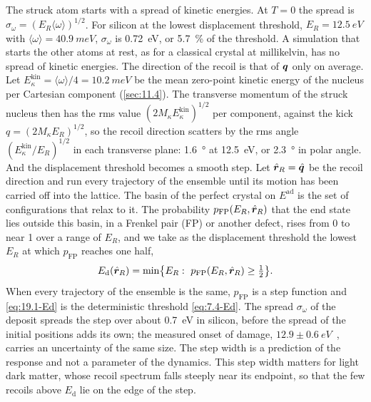 The struck atom starts with a spread of kinetic energies. At $T = 0$ the spread is $\sigma_\omega = (E_R\langle\omega\rangle)^{1/2}$. For silicon at the lowest displacement threshold, $E_R = \SI{12.5}{eV}$ with $\langle\omega\rangle = \SI{40.9}{meV}$, $\sigma_\omega$ is \SI{0.72}{eV}, or \SI{5.7}{\percent} of the threshold. A simulation that starts the other atoms at rest, as for a classical crystal at millikelvin, has no spread of kinetic energies. The direction of the recoil is that of $\bm{q}$ only on average. Let $E^{\mathrm{kin}}_\kappa = \langle\omega\rangle/4 = \SI{10.2}{meV}$ be the mean zero-point kinetic energy of the nucleus per Cartesian component (\cref{sec:11.4}). The transverse momentum of the struck nucleus then has the rms value $(2M_\kappa E^{\mathrm{kin}}_\kappa)^{1/2}$ per component, against the kick $q = (2M_\kappa E_R)^{1/2}$, so the recoil direction scatters by the rms angle $(E^{\mathrm{kin}}_\kappa/E_R)^{1/2}$ in each transverse plane: \SI{1.6}{\degree} at \SI{12.5}{eV}, or \SI{2.3}{\degree} in polar angle. And the displacement threshold becomes a smooth step. Let $\hat{\bm{r}}_R = \hat{\bm{q}}$ be the recoil direction and run every trajectory of the ensemble until its motion has been carried off into the lattice. The basin of the perfect crystal on $E^{\mathrm{ad}}$ is the set of configurations that relax to it. The probability $p_{\mathrm{FP}}(E_R, \hat{\bm{r}}_R)$ that the end state lies outside this basin, in a Frenkel pair (FP) or another defect, rises from 0 to near 1 over a range of $E_R$, and we take as the displacement threshold the lowest $E_R$ at which $p_{\mathrm{FP}}$ reaches one half,
\begin{equation}
  E_{\mathrm{d}}(\hat{\bm{r}}_R) = \min\bigl\{E_R :\ p_{\mathrm{FP}}(E_R, \hat{\bm{r}}_R) \ge \tfrac12\bigr\} .
  \label{eq:19.1-Ed}
\end{equation}
When every trajectory of the ensemble is the same, $p_{\mathrm{FP}}$ is a step function and \cref{eq:19.1-Ed} is the deterministic threshold \cref{eq:7.4-Ed}. The spread $\sigma_\omega$ of the deposit spreads the step over about \SI{0.7}{eV} in silicon, before the spread of the initial positions adds its own; the measured onset of damage, $12.9 \pm \SI{0.6}{eV}$~\cite{loferski1958radiation}, carries an uncertainty of the same size. The step width is a prediction of the response and not a parameter of the dynamics. This step width matters for light dark matter, whose recoil spectrum falls steeply near its endpoint, so that the few recoils above $E_{\mathrm{d}}$ lie on the edge of the step.


